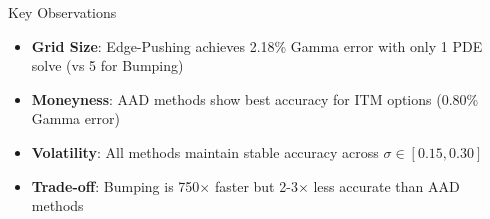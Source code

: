 \begin{block}{Key Observations}
\begin{itemize}
    \item \textbf{Grid Size}: Edge-Pushing achieves 2.18\% Gamma error with only 1 PDE solve (vs 5 for Bumping)
    \item \textbf{Moneyness}: AAD methods show best accuracy for ITM options (0.80\% Gamma error)
    \item \textbf{Volatility}: All methods maintain stable accuracy across $\sigma \in [0.15, 0.30]$
    \item \textbf{Trade-off}: Bumping is 750$\times$ faster but 2-3$\times$ less accurate than AAD methods
\end{itemize}
\end{block}
